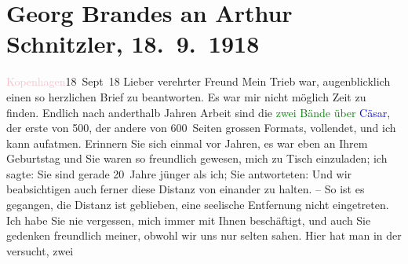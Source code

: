 

               \section[Georg Brandes an Arthur Schnitzler, 18. 9. 1918]{ Georg Brandes an Arthur Schnitzler, 18. 9. 1918}\nopagebreak{}\rehead{ }\normalsize\beginnumbering{} \toendnotes[C]{\smallbreak\pagebreak[2]} 
\toendnotes[C]{\smallbreak}\pstart
           \raggedleft{}{\pb}\textcolor{pink}{Kopenhagen}{}\ledrightnote{\textcolor{pink}{Kopenhagen}}{ }18 Sept 18\pend
           \pstart{}Lieber verehrter Freund\pend\pstart
           Mein Trieb war, augenblicklich einen so herzlichen Brief zu beantworten. Es war
                    mir nicht möglich Zeit zu finden. Endlich nach anderthalb Jahren Arbeit sind die
                        \textcolor{green}{zwei Bände über \textcolor{blue}{Cäsar}{}\ledrightnote{\textcolor{blue}{Gaius Iulius Caesar}}}{}, der erste von 500, der andere von 600 Seiten grossen Formats, vollendet,
                    und ich kann aufatmen.\pend
           \pstart
           Erinnern Sie sich einmal vor Jahren, es war eben an Ihrem Geburtstag und Sie
                    waren so freundlich gewesen, mich zu Tisch einzuladen; ich sagte: Sie sind
                    gerade 20 Jahre jünger als ich; Sie antworteten: Und wir beabsichtigen auch
                    ferner diese Distanz von einander zu halten. – So ist es gegangen, die Distanz
                    ist geblieben, eine seelische Entfernung nicht eingetreten.\pend
           \pstart
           Ich habe Sie nie vergessen, mich immer mit Ihnen beschäftigt, und auch Sie
                    gedenken freundlich meiner, obwohl wir uns nur selten sahen.\pend
           \pstart
           {\pb}Hier hat man in der \label{K_L02303_1v}\label{K_L02303_1h} versucht, zwei
